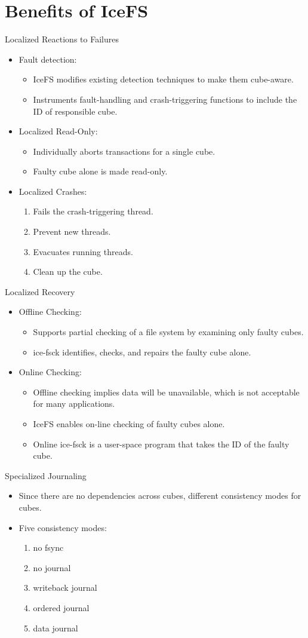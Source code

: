 \documentclass[aspectratio=169]{beamer}
\newcommand{\bi}{\begin{itemize}}
\newcommand{\ei}{\end{itemize}}
\newcommand{\bn}{\begin{enumerate}}
\newcommand{\en}{\end{enumerate}}
\begin{document}
\section{Benefits of IceFS}
\begin{frame}{Localized Reactions to Failures}
    \bi
\item Fault detection:
    \bi
\item IceFS modifies existing detection techniques to make them cube-aware.
\item Instruments fault-handling and crash-triggering functions to include the
    ID of responsible cube.
    \ei
\item Localized Read-Only:
    \bi
\item Individually aborts transactions for a single cube.
\item Faulty cube alone is made read-only.
    \ei
\item Localized Crashes:
    \bn
\item Fails the crash-triggering thread.
\item Prevent new threads.
\item Evacuates running threads.
\item Clean up the cube.
    \en
    \ei
\end{frame}

\begin{frame}{Localized Recovery} 
    \bi
\item Offline Checking: 
    \bi
\item Supports partial checking of a file system by examining
    only faulty cubes.
\item ice-fsck identifies, checks, and repairs the faulty cube alone.
    \ei
\item Online Checking:
    \bi
\item Offline checking implies data will be unavailable, which is not acceptable
    for many applications.
\item IceFS enables on-line checking of faulty cubes alone.
\item Online ice-fsck is a user-space program that takes the ID of the faulty
    cube.
    \ei
    \ei
\end{frame}

\begin{frame}{Specialized Journaling}
    \bi
\item Since there are no dependencies across cubes, different consistency modes
    for cubes.
\item Five consistency modes:
    \bn
\item no fsync
\item no journal
\item writeback journal
\item ordered journal
\item data journal
    \en
    \ei
\end{frame}
\end{document}
